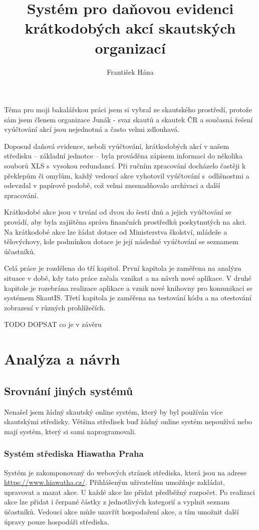 \documentclass[thesis=B,czech]{FITthesis}[2012/04/27]
\title{Systém pro daňovou evidenci krátkodobých akcí skautských organizací}
\author{František Hána} %
\begin{document}

\begin{introduction}
Téma pro moji bakalářskou práci jsem si vybral ze skautského prostředí, protože sám jsem členem organizace Junák - svaz skautů a skautek ČR a současná řešení vyúčtování akcí jsou nejednotná a často velmi zdlouhavá.

Doposud daňová evidence, neboli vyúčtování, krátkodobých akcí v našem středisku -- základní jednotce -- byla prováděna zápisem informací do několika souborů XLS s~vysokou redundancí. Při ručním zpracování docházelo častěji k překlepům či omylům, každý vedoucí akce vyhotovil vyúčtování s~odlišnostmi a odevzdal v papírové podobě, což velmi znesnadňovalo archivaci a další zpracování. 

Krátkodobé akce jsou v trvání od dvou do šesti dnů a jejich vyúčtování se provádí, aby byla zajištěna správa finančních prostředků poskytnutých na akci. Na krátkodobé akce lze žádat dotace od Ministerstva školství, mládeže a tělovýchovy, kde podmínkou dotace je její následné vyúčtování se seznamem účastníků.

Celá práce je rozdělena do tří kapitol. První kapitola je zaměřena na analýzu situace v době, kdy tato práce začala vznikat a na návrh nové aplikace. V druhé kapitole je rozebrána realizace aplikace a vznik nové knihovny pro komunikaci se systémem SkautIS. Třetí kapitola je zaměřena na testování kódu a na otestování zobrazení v různých prohlížečích. 


TODO DOPSAT co je v závěru 



\end{introduction}

\chapter{Analýza a návrh}
\section{Srovnání jiných systémů}
Nenašel jsem žádný skautský online systém, který by byl používán více skautskými středisky. Většina středisek buď žádný online systém nepoužívá nebo mají systém, který si sami naprogramovali.

\subsection{Systém střediska Hiawatha Praha}
Systém je zakomponovaný do webových stránek střediska, která jsou na adrese \url{https://www.hiawatha.cz/}. Přihlášeným uživatelům umožňuje zakládat, upravovat a mazat akce. U každé akce lze přidat předběžný rozpočet. Po realizaci akce lze přidat i čerpané částky z jednotlivých kategorií a vyplnit seznam účastníků. Vedoucí akce může uzavřít hospodaření akce, a tím umožnit další úpravy pouze hospodáři střediska.
\end{document}
